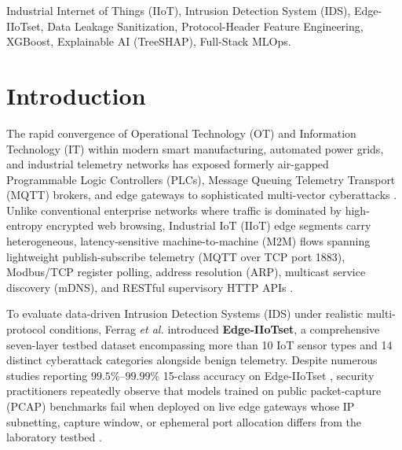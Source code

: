 \documentclass[conference]{IEEEtran}
\begin{document}
\begin{abstract}
\end{abstract}

\begin{IEEEkeywords}
Industrial Internet of Things (IIoT), Intrusion Detection System (IDS), Edge-IIoTset, Data Leakage Sanitization, Protocol-Header Feature Engineering, XGBoost, Explainable AI (TreeSHAP), Full-Stack MLOps.
\end{IEEEkeywords}

\section{Introduction}
The rapid convergence of Operational Technology (OT) and Information Technology (IT) within modern smart manufacturing, automated power grids, and industrial telemetry networks has exposed formerly air-gapped Programmable Logic Controllers (PLCs), Message Queuing Telemetry Transport (MQTT) brokers, and edge gateways to sophisticated multi-vector cyberattacks \cite{sisinni2018, jayalaxmi2021}. Unlike conventional enterprise networks where traffic is dominated by high-entropy encrypted web browsing, Industrial IoT (IIoT) edge segments carry heterogeneous, latency-sensitive machine-to-machine (M2M) flows spanning lightweight publish-subscribe telemetry (MQTT over TCP port 1883), Modbus/TCP register polling, address resolution (ARP), multicast service discovery (mDNS), and RESTful supervisory HTTP APIs \cite{zolanvari2019}.

To evaluate data-driven Intrusion Detection Systems (IDS) under realistic multi-protocol conditions, Ferrag \textit{et al.} \cite{ferrag2022} introduced \textbf{Edge-IIoTset}, a comprehensive seven-layer testbed dataset encompassing more than 10 IoT sensor types and 14 distinct cyberattack categories alongside benign telemetry. Despite numerous studies reporting $99.5\%\text{--}99.99\%$ 15-class accuracy on Edge-IIoTset \cite{tareq2022, khacha2022, alshehri2023}, security practitioners repeatedly observe that models trained on public packet-capture (PCAP) benchmarks fail when deployed on live edge gateways whose IP subnetting, capture window, or ephemeral port allocation differs from the laboratory testbed \cite{flood2024, apruzzese2023}.
\end{document}

